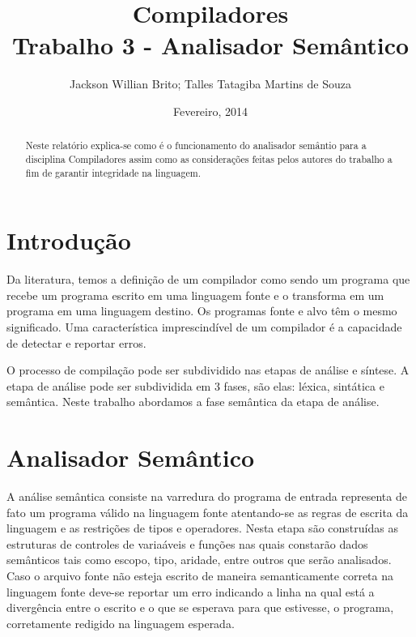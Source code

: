 \documentclass[a4paper,12pt]{report}
\begin{document}
\title{Compiladores\\Trabalho 3 - Analisador Sem\^antico}
\author{Jackson Willian Brito; Talles Tatagiba Martins de Souza}
\date{Fevereiro, 2014}
\maketitle

\pagebreak

\tableofcontents

\pagebreak

\renewcommand{\thesection}{\arabic{section}} 

\begin{abstract}
Neste relat\'orio explica-se como \'e o funcionamento do analisador sem\^antio para a disciplina Compiladores assim como as considera\c{c}\~oes feitas pelos autores do trabalho a fim de garantir integridade na linguagem.
\end{abstract}

\section{Introdu\c{c}\~ao}

Da literatura, temos a defini\c{c}\~ao de um compilador como sendo um programa que recebe um programa escrito em uma linguagem
fonte e o transforma em um programa em uma linguagem destino. Os programas fonte e alvo t\^em o mesmo significado. Uma caracter\'istica
imprescind\'ivel de um compilador \'e a capacidade de detectar e reportar erros.

O processo de compila\c{c}\~ao pode ser subdividido nas etapas de an\'alise e s\'intese. A etapa de an\'alise pode ser subdividida em 
3 fases, s\~ao elas: l\'exica, sint\'atica e sem\^antica. Neste trabalho abordamos a fase sem\^antica da etapa de an\'alise.

\section{Analisador Sem\^antico}

A an\'alise sem\^antica consiste na varredura do programa de entrada representa de fato
um programa v\'alido na linguagem fonte atentando-se as regras de escrita da linguagem e 
as restri\c{c}\~oes de tipos e operadores. Nesta etapa s\~ao constru\'idas as estruturas de
controles de varia\'aveis e fun\c{c}\~oes nas quais constar\~ao dados sem\^anticos tais como
escopo, tipo, aridade, entre outros que ser\~ao analisados. Caso o arquivo fonte n\~ao esteja 
escrito de maneira semanticamente correta na linguagem fonte deve-se
reportar um erro indicando a linha na qual est\'a a diverg\^encia entre o escrito e o que 
se esperava para que estivesse, o programa, corretamente redigido na linguagem esperada.
\end{document}
